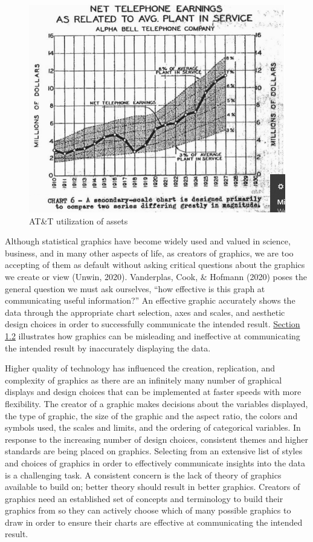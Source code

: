 \documentclass[print]{nuthesis}
\begin{document}
\begin{figure}[tbp]

{\centering \includegraphics[width=0.75\linewidth,]{images/ATandT-revenue} 

}

\caption{AT\&T utilization of assets}\label{fig:ATandT-revenue}
\end{figure}

Although statistical graphics have become widely used and valued in science, business, and in many other aspects of life, as creators of graphics, we are too accepting of them as default without asking critical questions about the graphics we create or view (Unwin, 2020).
Vanderplas, Cook, \& Hofmann (2020) poses the general question we must ask ourselves, ``how effective is this graph at communicating useful information?''
An effective graphic accurately shows the data through the appropriate chart selection, axes and scales, and aesthetic design choices in order to successfully communicate the intended result.
\protect\hyperlink{misleading-graphics}{Section 1.2} illustrates how graphics can be misleading and ineffective at communicating the intended result by inaccurately displaying the data.

Higher quality of technology has influenced the creation, replication, and complexity of graphics as there are an infinitely many number of graphical displays and design choices that can be implemented at faster speeds with more flexibility.
The creator of a graphic makes decisions about the variables displayed, the type of graphic, the size of the graphic and the aspect ratio, the colors and symbols used, the scales and limits, and the ordering of categorical variables.
In response to the increasing number of design choices, consistent themes and higher standards are being placed on graphics.
Selecting from an extensive list of styles and choices of graphics in order to effectively communicate insights into the data is a challenging task.
A consistent concern is the lack of theory of graphics available to build on; better theory should result in better graphics.
Creators of graphics need an established set of concepts and terminology to build their graphics from so they can actively choose which of many possible graphics to draw in order to ensure their charts are effective at communicating the intended result.
\end{document}
